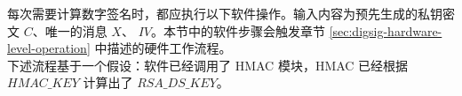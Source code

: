 \documentclass[main\_\_CN.tex]{subfiles}
\begin{document}
每次需要计算数字签名时，都应执行以下软件操作。输入内容为预先生成的私钥密文 \begin{math}C\end{math}、唯一的消息 \begin{math}X\end{math}、 \begin{math}IV\end{math}。本节中的软件步骤会触发章节 \ref{sec:digsig-hardware-level-operation} 中描述的硬件工作流程。\\
下述流程基于一个假设：软件已经调用了 HMAC 模块，HMAC 已经根据 \begin{math}HMAC\_KEY\end{math} 计算出了 \begin{math}RSA\_DS\_KEY\end{math}。
\end{document}

